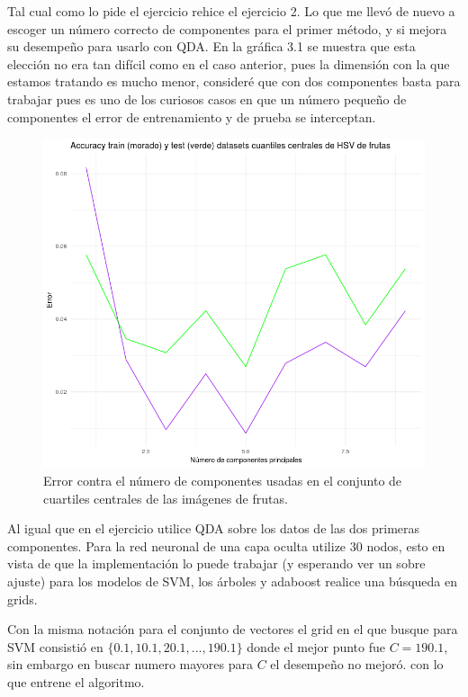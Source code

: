 \documentclass[paper=letter, fontsize=11pt]{scrartcl}
\numberwithin{equation}{section} %
\numberwithin{figure}{section} %
\numberwithin{table}{section} %
\begin{document}
Tal cual como lo pide el ejercicio rehice el ejercicio 2. Lo que me llevó de nuevo a escoger un número correcto de componentes para el primer método, y si mejora su desempeño para usarlo con QDA.  En la gráfica 3.1 se muestra que esta elección no era tan difícil como en el caso anterior, pues la dimensión con la que estamos tratando es mucho menor, consideré que con dos componentes basta para trabajar pues es uno de los curiosos casos en que un número pequeño de componentes el error de entrenamiento y de prueba se interceptan.
\begin{figure}[H]
  \begin{center}
    \includegraphics[scale =.40]{errores_para_nueva_p.png}
    \caption{Error contra el número de componentes usadas en el conjunto de cuartiles centrales de las imágenes de frutas. }
    \label{figura1_2}
  \end{center}
\end{figure}
\FloatBarrier
Al igual que en el ejercicio utilice QDA sobre los datos de las dos primeras componentes. Para la red neuronal de una capa oculta utilize 30 nodos, esto en vista de que la implementación lo puede trabajar (y esperando ver un sobre ajuste) para los modelos de SVM, los árboles y adaboost realice una búsqueda en grids. 

Con la misma notación para el conjunto de vectores el grid en el que busque para SVM consistió en $\{0.1, 10.1, 20.1, ...,190.1\}$ donde el mejor punto fue $C=190.1$, sin embargo en buscar numero mayores para $C$ el desempeño no mejoró. con lo que entrene el algoritmo.\\
\end{document}
